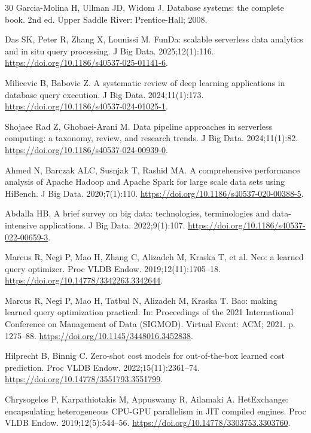 \documentclass[10pt,a4paper]{article}
\begin{document}
\begin{thebibliography}{30}
Garcia-Molina H, Ullman JD, Widom J. Database systems: the complete book. 2nd ed. Upper Saddle River: Prentice-Hall; 2008.

Das SK, Peter R, Zhang X, Lounissi M. FunDa: scalable serverless data analytics and in situ query processing. J Big Data. 2025;12(1):116. \url{https://doi.org/10.1186/s40537-025-01141-6}.

Milicevic B, Babovic Z. A systematic review of deep learning applications in database query execution. J Big Data. 2024;11(1):173. \url{https://doi.org/10.1186/s40537-024-01025-1}.

 Shojaee Rad Z, Ghobaei-Arani M. Data pipeline approaches in serverless computing: a taxonomy, review, and research trends. J Big Data. 2024;11(1):82. \url{https://doi.org/10.1186/s40537-024-00939-0}.

Ahmed N, Barczak ALC, Susnjak T, Rashid MA. A comprehensive performance analysis of Apache Hadoop and Apache Spark for large scale data sets using HiBench. J Big Data. 2020;7(1):110. \url{https://doi.org/10.1186/s40537-020-00388-5}.

Abdalla HB. A brief survey on big data: technologies, terminologies and data-intensive applications. J Big Data. 2022;9(1):107. \url{https://doi.org/10.1186/s40537-022-00659-3}.

Marcus R, Negi P, Mao H, Zhang C, Alizadeh M, Kraska T, et al. Neo: a learned query optimizer. Proc VLDB Endow. 2019;12(11):1705--18. \url{https://doi.org/10.14778/3342263.3342644}.

Marcus R, Negi P, Mao H, Tatbul N, Alizadeh M, Kraska T. Bao: making learned query optimization practical. In: Proceedings of the 2021 International Conference on Management of Data (SIGMOD). Virtual Event: ACM; 2021. p. 1275--88. \url{https://doi.org/10.1145/3448016.3452838}.

Hilprecht B, Binnig C. Zero-shot cost models for out-of-the-box learned cost prediction. Proc VLDB Endow. 2022;15(11):2361--74. \url{https://doi.org/10.14778/3551793.3551799}.

Chrysogelos P, Karpathiotakis M, Appuswamy R, Ailamaki A. HetExchange: encapsulating heterogeneous CPU-GPU parallelism in JIT compiled engines. Proc VLDB Endow. 2019;12(5):544--56. \url{https://doi.org/10.14778/3303753.3303760}.


\end{thebibliography}
\end{document}
